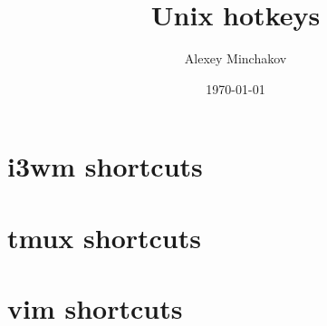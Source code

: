\documentclass[a4paper, 12pt]{article}
\title{Unix hotkeys}
\author{Alexey Minchakov}
\date{\today}
\begin{document}

\section{i3wm shortcuts}


\pagebreak
\section{tmux shortcuts}


\pagebreak
\section{vim shortcuts}

\end{document}
